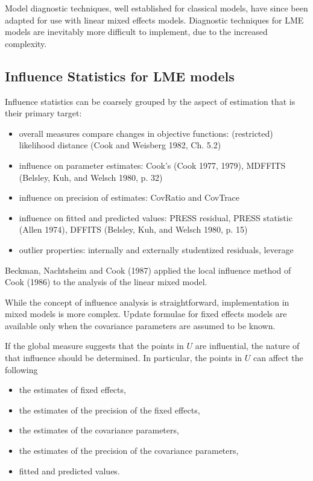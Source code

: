 \documentclass[12pt, a4paper]{article}
\begin{document}
	Model diagnostic techniques, well established for classical models, have since been adapted for use with linear mixed effects models. Diagnostic techniques for LME models are inevitably more difficult to implement, due to the increased complexity.
	
	
	\subsection{Influence Statistics for LME models} %
	Influence statistics can be coarsely grouped by the aspect of estimation that is their primary target:
	\begin{itemize}
		\item overall measures compare changes in objective functions: (restricted) likelihood distance (Cook and Weisberg 1982, Ch. 5.2)
		\item influence on parameter estimates: Cook's  (Cook 1977, 1979), MDFFITS (Belsley, Kuh, and Welsch 1980, p. 32)
		\item influence on precision of estimates: CovRatio and CovTrace
		\item influence on fitted and predicted values: PRESS residual, PRESS statistic (Allen 1974), DFFITS (Belsley, Kuh, and Welsch 1980, p. 15)
		\item outlier properties: internally and externally studentized residuals, leverage
	\end{itemize}
	
	Beckman, Nachtsheim and Cook (1987) \citet{Beckman} applied the local influence method of Cook (1986) to the analysis of the linear mixed model.
	
	While the concept of influence analysis is straightforward, implementation in mixed models is more complex. Update formulae for fixed effects models are available only when the covariance parameters are assumed to be known.
	
	If the global measure suggests that the points in $U$ are influential, the nature of that influence should be determined. In particular, the points in $U$ can affect the following
	
	\begin{itemize}
		\item the estimates of fixed effects,
		\item the estimates of the precision of the fixed effects,
		\item the estimates of the covariance parameters,
		\item the estimates of the precision of the covariance parameters,
		\item fitted and predicted values.
	\end{itemize}
	\newpage
\end{document}
